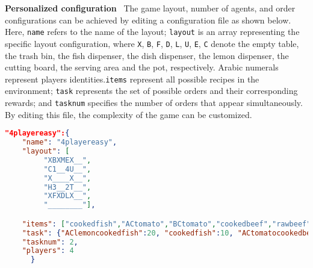 \textbf{Personalized configuration} \ The game layout, number of agents, and order configurations can be achieved by editing a configuration file as shown below. Here, \texttt{name} refers to the name of the layout; \texttt{layout} is an array representing the specific layout configuration, where \texttt{X}, \texttt{B}, \texttt{F}, \texttt{D}, \texttt{L}, \texttt{U}, \texttt{E}, \texttt{C} denote the empty table, the trash bin, the fish dispenser, the dish dispenser, the lemon dispenser, the cutting board, the serving area and the pot, respectively. Arabic numerals represent players identities.\texttt{items} represent all possible recipes in the environment; \texttt{task} represents the set of possible orders and their corresponding rewards; and \texttt{tasknum} specifies the number of orders that appear simultaneously. By editing this file, the complexity of the game can be customized.

\begin{lstlisting}[language=JSON, caption=maps.json example of the env configurations=code:example2]
"4playereasy":{
    "name": "4playereasy",
    "layout": [
         "XBXMEX__",
         "C1__4U__",
         "X____X__",
         "H3__2T__",
         "XFXDLX__",
         "________"],

    "items": ["cookedfish","ACtomato","BCtomato","cookedbeef","rawbeef","hamburger", "ACtomatocookedbeefhamburger","ACtomatohamburger","cookedbeefhamburger", "dish", "BClemon", "AClemon", "rawfish", "AClemoncookedfish"],
    "task": {"AClemoncookedfish":20, "cookedfish":10, "ACtomatocookedbeefhamburger":25,"cookedbeefhamburger":15},
    "tasknum": 2,
    "players": 4
      }
\end{lstlisting}